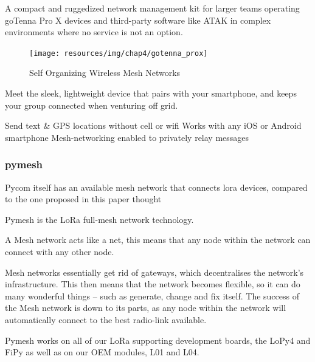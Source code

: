 			A compact and ruggedized network management kit for larger teams operating goTenna Pro X devices and third-party software like ATAK in complex environments where no service is not an option.
			
			\noindent
			\begin{minipage}{0.48\textwidth}%
				\begin{figure}[H]
					\centering
					\texttt{[image: resources/img/chap4/gotenna\_prox]}
					\caption[Self Organizing Wireless Mesh Networks]{Self Organizing Wireless Mesh Networks\cite{BADIS2015653}}
					\label{img:wms_microsoft}
				\end{figure}
			\end{minipage}%
			\hfill%
			\begin{minipage}{0.5\textwidth}\raggedright
				Meet the sleek, lightweight device that pairs with your smartphone, and keeps your group connected when venturing off grid.
				
				Send text \& GPS locations without cell or wifi
				Works with any iOS or Android smartphone
				Mesh-networking enabled to privately relay messages
			\end{minipage}
				

						
						
			\subsubsection{pymesh}
			
				Pycom itself has an available mesh network that connects lora devices, compared to the one proposed in this paper thought

				
				
				Pymesh is the LoRa full-mesh network technology.
				
				A Mesh network acts like a net, this means that any node within the network can connect with any other node.
				
				Mesh networks essentially get rid of gateways, which decentralises the network’s infrastructure. This then means that the network becomes flexible, so it can do many wonderful things – such as generate, change and fix itself. The success of the Mesh network is down to its parts, as any node within the network will automatically connect to the best radio-link available.
				
				Pymesh works on all of our LoRa supporting development boards, the LoPy4 and FiPy as well as on our OEM modules, L01 and L04.
				
